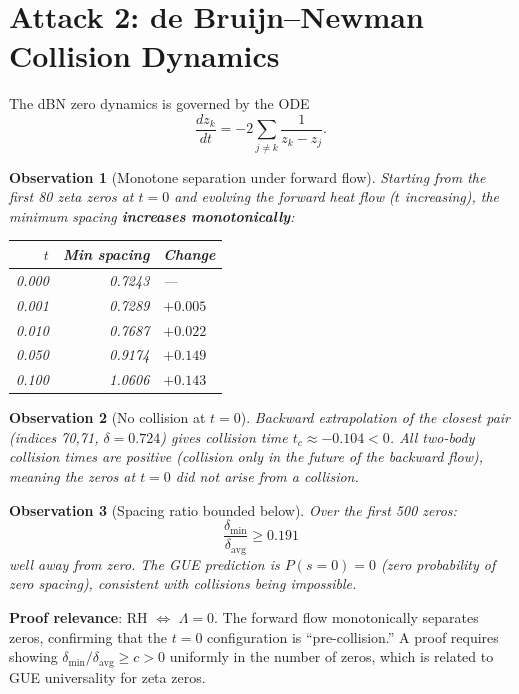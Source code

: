 \documentclass[11pt]{article}
\newtheorem{observation}{Observation}
\begin{document}
\section{Attack 2: de Bruijn--Newman Collision Dynamics}

The dBN zero dynamics is governed by the ODE
\[
\frac{dz_k}{dt} = -2\sum_{j\neq k} \frac{1}{z_k - z_j}.
\]

\begin{observation}[Monotone separation under forward flow]
Starting from the first 80 zeta zeros at $t=0$ and evolving the forward heat flow ($t$ increasing), the minimum spacing \textbf{increases monotonically}:

\begin{center}
\begin{tabular}{rrl}
\toprule
$t$ & Min spacing & Change \\
\midrule
0.000 & 0.7243 & --- \\
0.001 & 0.7289 & $+0.005$ \\
0.010 & 0.7687 & $+0.022$ \\
0.050 & 0.9174 & $+0.149$ \\
0.100 & 1.0606 & $+0.143$ \\
\bottomrule
\end{tabular}
\end{center}
\end{observation}

\begin{observation}[No collision at $t=0$]
Backward extrapolation of the closest pair (indices 70,71, $\delta = 0.724$) gives collision time $t_c \approx -0.104 < 0$.  All two-body collision times are positive (collision only in the \emph{future} of the backward flow), meaning the zeros at $t=0$ did not arise from a collision.
\end{observation}

\begin{observation}[Spacing ratio bounded below]
Over the first 500 zeros:
\[
\frac{\delta_{\min}}{\delta_{\mathrm{avg}}} \geq 0.191
\]
well away from zero.  The GUE prediction is $P(s=0) = 0$ (zero probability of zero spacing), consistent with collisions being impossible.
\end{observation}

\noindent\textbf{Proof relevance}: RH $\Leftrightarrow$ $\Lambda = 0$.  The forward flow monotonically separates zeros, confirming that the $t=0$ configuration is ``pre-collision.''  A proof requires showing $\delta_{\min}/\delta_{\mathrm{avg}} \geq c > 0$ uniformly in the number of zeros, which is related to GUE universality for zeta zeros.
\end{document}
